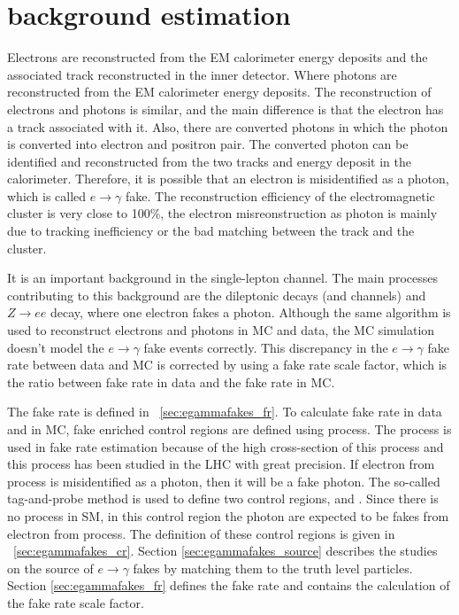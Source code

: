 \section{\efake background estimation}
\label{sec:background-estimation-efake}
Electrons are reconstructed from the EM calorimeter energy deposits and the associated track reconstructed in the inner detector. Where photons are reconstructed from the EM calorimeter energy deposits. The reconstruction of electrons and photons is similar, and the main difference is that the electron has a track associated with it. Also, there are converted photons in which the photon is converted into electron and positron pair. The converted photon can be identified and reconstructed from the two tracks and energy deposit in the calorimeter. Therefore, it is possible that an electron is misidentified as a photon, which is called $e\to\gamma$ fake. The reconstruction efficiency of the electromagnetic cluster is very close to 100\%, the electron misreonstruction as photon is mainly due to tracking inefficiency or the bad matching between the track and the cluster.

It is an important background in the single-lepton channel. The main processes contributing to this background are the \ttbar dileptonic decays (\chee and \chemu channels) and $Z\to ee$ decay, where one electron fakes a photon. Although the same algorithm is used to reconstruct electrons and photons in MC and data, the MC simulation doesn't model the $e\to\gamma$ fake events correctly. This discrepancy in the $e\to\gamma$ fake rate between data and MC is corrected by using a fake rate scale factor, which is the ratio between fake rate in data and the fake rate in MC. 

The fake rate is defined in ~\cref{sec:egammafakes_fr}. To calculate fake rate in data and in MC, fake enriched control regions are defined using \zee process. The \zee process is used in fake rate estimation because of the high cross-section of this process and this process has been studied in the LHC with great precision. If electron from \zee process is misidentified as a photon, then it will be a fake photon. The so-called tag-and-probe method is used to define two control regions, \zee and \zegamma. Since there is no \zegamma process in SM, in this control region the photon are expected to be fakes from electron from \zee process. The definition of these control regions is given in ~\cref{sec:egammafakes_cr}. Section \ref{sec:egammafakes_source} describes the studies on the source of $e\to\gamma$ fakes by matching them to the truth level particles. Section \ref{sec:egammafakes_fr} defines the fake rate and contains the calculation of the fake rate scale factor.

